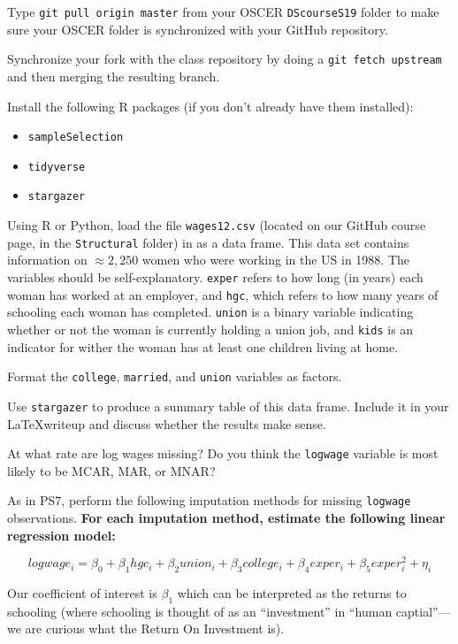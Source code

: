 \documentclass[12pt,english]{exam}
\begin{document}
\begin{questions}
\question Type \texttt{git pull origin master} from your OSCER \texttt{DScourseS19} folder to make sure your OSCER folder is synchronized with your GitHub repository. 

\question Synchronize your fork with the class repository by doing a \texttt{git fetch upstream} and then merging the resulting branch. 

\question Install the following R packages (if you don't already have them installed):
\begin{itemize}
    \item \texttt{sampleSelection}
    \item \texttt{tidyverse}
    \item \texttt{stargazer}
\end{itemize}

\question Using R or Python, load the file \texttt{wages12.csv} (located on our GitHub course page, in the \texttt{Structural} folder) in as a data frame. This data set contains information on $\approx 2,250$ women who were working in the US in 1988. The variables should be self-explanatory. \texttt{exper} refers to how long (in years) each woman has worked at an employer, and \texttt{hgc}, which refers to how many years of schooling each woman has completed. \texttt{union} is a binary variable indicating whether or not the woman is currently holding a union job, and \texttt{kids} is an indicator for wither the woman has at least one children living at home.

\question Format the \texttt{college}, \texttt{married}, and \texttt{union} variables as factors.

\question Use \texttt{stargazer} to produce a summary table of this data frame. Include it in your \LaTeX writeup and discuss whether the results make sense.

At what rate are log wages missing? Do you think the \texttt{logwage} variable is most likely to be MCAR, MAR, or MNAR?

\question As in PS7, perform the following imputation methods for missing \texttt{logwage} observations. \textbf{For each imputation method, estimate the following linear regression model:}

\[
    logwage_{i} = \beta_{0} +  \beta_{1}hgc_{i} + \beta_{2}union_{i} + \beta_{3}college_{i} + \beta_{4}exper_{i} + \beta_{5}exper^{2}_{i} + \eta_{i}
\]

Our coefficient of interest is $\beta_{1}$ which can be interpreted as the returns to schooling (where schooling is thought of as an ``investment'' in ``human captial''---we are curious what the Return On Investment is).


\end{questions}
\end{document}
